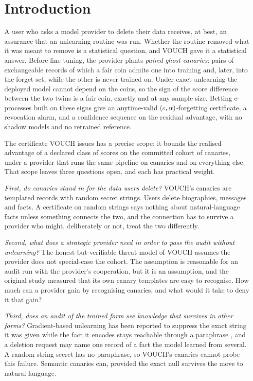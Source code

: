 \section{Introduction}\label{sec:intro}

A user who asks a model provider to delete their data receives, at best, an assurance
that an unlearning routine was run. Whether the routine removed what it was meant to
remove is a statistical question, and VOUCH \citep{dang2026vouch} gave it a statistical
answer. Before fine-tuning, the provider plants \emph{paired ghost canaries}: pairs of
exchangeable records of which a fair coin admits one into training and, later, into
the forget set, while the other is never trained on. Under exact unlearning the deployed
model cannot depend on the coins, so the sign of the score difference between the two
twins is a fair coin, exactly and at any sample size. Betting e-processes built on these
signs give an anytime-valid $(\varepsilon,\alpha)$-forgetting certificate, a revocation alarm,
and a confidence sequence on the residual advantage, with no shadow models and no
retrained reference.

The certificate VOUCH issues has a precise scope: it bounds the realised advantage of a
declared class of scores on the committed cohort of canaries, under a provider that runs
the same pipeline on canaries and on everything else. That scope leaves three questions
open, and each has practical weight.

\emph{First, do canaries stand in for the data users delete?} VOUCH's canaries are
templated records with random secret strings. Users delete biographies, messages and
facts. A certificate on random strings says nothing about natural-language facts unless
something connects the two, and the connection has to survive a provider who might,
deliberately or not, treat the two differently.

\emph{Second, what does a strategic provider need in order to pass the audit without
unlearning?} The honest-but-verifiable threat model of VOUCH assumes the provider does
not special-case the cohort. The assumption is reasonable for an audit run with the
provider's cooperation, but it is an assumption, and the original study measured that
its own canary templates are easy to recognise. How much can a provider gain by
recognising canaries, and what would it take to deny it that gain?

\emph{Third, does an audit of the trained form see knowledge that survives in other
forms?} Gradient-based unlearning has been reported to suppress the exact string it was
given while the fact it encodes stays reachable through a paraphrase
\citep{li2026beliefs}, and a deletion request may name one record of a fact the model
learned from several. A random-string secret has no paraphrase, so
VOUCH's canaries cannot probe this failure. Semantic canaries can, provided the exact
null survives the move to natural language.

